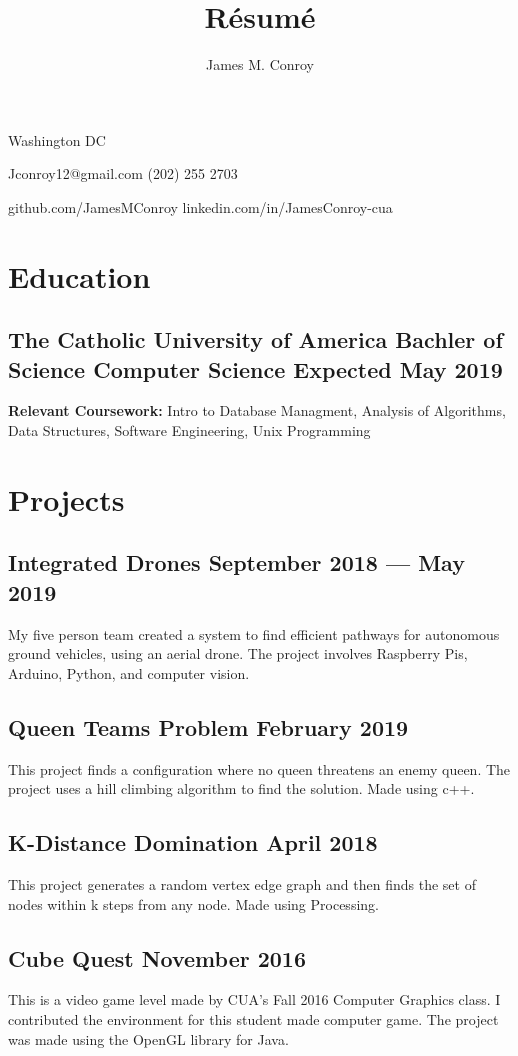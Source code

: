 \documentclass{article}
\author{James M. Conroy}
\title{R\'esum\'e}
\makeatletter
\renewcommand{\maketitle} {
	\begin{center}
	{\huge\bfseries
	\theauthor}

	Washington DC
	\end{center}


	Jconroy12@gmail.com
	\hfill (202) 255 2703

	github.com/JamesMConroy
	\hfill linkedin.com/in/JamesConroy-cua
}
\makeatother
\begin{document}
\maketitle
\section{Education}
\subsection{The Catholic University of America \hfill Bachler of Science Computer Science \hfill  Expected May 2019 }

\textbf {Relevant Coursework:}
Intro to Database Managment,
Analysis of Algorithms,
Data Structures,
Software Engineering,
Unix Programming

\section{Projects}
\subsection{Integrated Drones \hfill September 2018 --- May 2019}
My five person team created a system to find efficient pathways for autonomous ground vehicles, using an aerial drone.
The project involves Raspberry Pis, Arduino, Python, and computer vision.

\subsection{Queen Teams Problem \hfill February 2019}
This project finds a configuration where no queen threatens an enemy queen.
The project uses a hill climbing algorithm to find the solution.
Made using c++.

\subsection{K-Distance Domination \hfill April 2018}
This project generates a random vertex edge graph and then finds the set of nodes within k steps from any node.
Made using Processing.

\subsection{Cube Quest \hfill November 2016}
This is a video game level made by CUA's Fall 2016 Computer Graphics class.
I contributed the environment for this student made computer game.
The project was made using the OpenGL library for Java.
\end{document}

